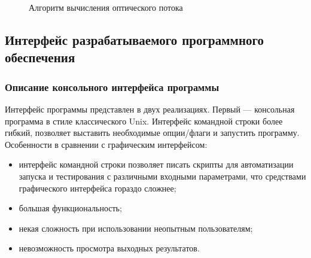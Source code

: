 \begin{figure}[h!]
\caption{Алгоритм вычисления оптического потока}
\label{fig:calc_opt_flow}
\end{figure}
\subsection {Интерфейс разрабатываемого программного обеспечения}
\subsubsection{Описание консольного интерфейса программы}%
Интерфейс программы представлен в двух реализациях.
Первый — консольная программа в стиле классического Unix. Интерфейс командной строки более гибкий, позволяет выставить необходимые опции/флаги и запустить программу. Особенности в сравнении с графическим интерфейсом:
\begin{itemize}
\item интерфейс командной строки позволяет писать скрипты для автоматизации запуска и тестирования с различными входными параметрами, что средствами графического интерфейса гораздо сложнее;
\item большая функциональность;
\item некая сложность при использовании неопытным пользователям;
\item невозможность просмотра выходных результатов.
\end{itemize}

